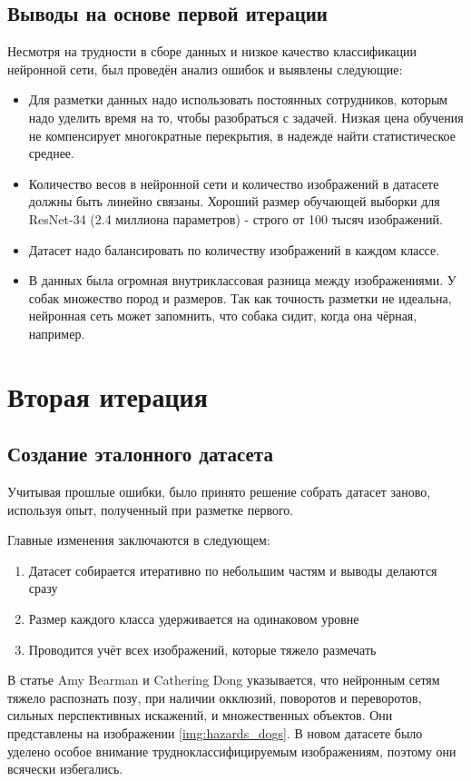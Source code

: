 \subsection{Выводы на основе первой итерации}
Несмотря на трудности в сборе данных и низкое качество классификации нейронной сети, был проведён анализ ошибок и выявлены следующие:
\begin{itemize}
    \item Для разметки данных надо использовать постоянных сотрудников, которым надо уделить время на то, чтобы разобраться с задачей. Низкая цена обучения не компенсирует многократные перекрытия, в надежде найти статистическое среднее.
    \item Количество весов в нейронной сети и количество изображений в датасете должны быть линейно связаны. Хороший размер обучающей выборки для ResNet-34 (2.4 миллиона параметров) - строго от 100 тысяч изображений.
    \item Датасет надо балансировать по количеству изображений в каждом классе.
    \item В данных была огромная внутриклассовая разница между изображениями. У собак множество пород и размеров. Так как точность разметки не идеальна, нейронная сеть может запомнить, что собака сидит, когда она чёрная, например. 
\end{itemize}{}

\section{Вторая итерация}

\subsection{Создание эталонного датасета} \label{subsect3_1_2}
Учитывая прошлые ошибки, было принято решение собрать датасет заново, используя опыт, полученный при разметке первого.

Главные изменения заключаются в следующем:
\begin{enumerate}
    \item Датасет собирается итеративно по небольшим частям и выводы делаются сразу
    \item Размер каждого класса удерживается на одинаковом уровне
    \item Проводится учёт всех изображений, которые тяжело размечать
\end{enumerate}{}

В статье Amy Bearman и Cathering Dong \cite{Bearman2015HumanPE} указывается, что нейронным сетям тяжело распознать позу, при наличии окклюзий, поворотов и переворотов, сильных перспективных искажений, и множественных объектов. Они представлены на изображении \ref{img:hazards_dogs}. В новом датасете было уделено особое внимание трудноклассифицируемым изображениям, поэтому они всячески избегались.

